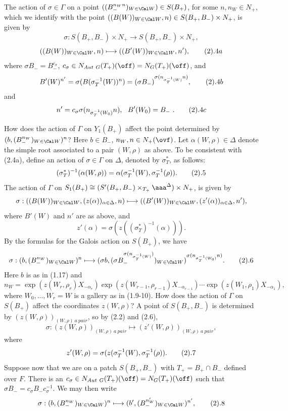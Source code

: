 \par
The action of $\sigma\in\Gamma$ on a point 
$((B_-^{n_Wn})_{W\in{\Cal W}})\in
S(B_+)$, for some
$n,n_W\in N_+$, which we identify with the point
$((B(W))_{W\in{\Cal W}},n)\in S(B_+,B_-)\times N_+$,
is given by
$$
\sigma: S(B_+,B_-)\times N_+ \rightarrow S(B_+,B_-)\times N_+,
$$
$$
((B(W))_{W\in{\Cal W}},n)\longmapsto
((B'(W))_{W\in{\Cal W}},n'),
\tag 2.4a
$$
where $\sigma B_-=B_-^{c_\sigma}$,
$c_\sigma\in N_{Aut\ G}(T_+)(\off)=N_G(T_+)(\off)$, and
$$
B'(W)^{n'}=\sigma(B(\sigma_T^{-1}(W))^n)=
(\sigma B_-)^{\sigma(n_{\sigma_T^{-1}(W)}n)},
\tag 2.4b
$$
and
$$
n'=c_\sigma\sigma(n_{\sigma_T^{-1}(W_0)}n),\ \ B'(W_0)= B_- \ .
\tag 2.4c
$$
\par
How does the action of $\Gamma$ on $Y_1(B_+)$ affect the
point determined by $(b,(B_-^{n_W})_{W\in{\Cal W}})^{n}$?
Here $b\in B_-$, $n_W,n\in N_+(\ovf)$. 
Let $\alpha(W,\rho)\in\Delta$ denote the simple root associated to
a pair $(W,\rho)$ as above.
To be consistent with (2.4a), define an action of $\sigma\in\Gamma$
on $\Delta$, denoted by $\sigma_T^*$, as follows:
$$
(\sigma_T^*)^{-1}(\alpha(W,\rho))
=\alpha(\sigma_T^{-1}(W),\sigma_T^{-1}(\rho)).
\tag 2.5
$$
The action of $\Gamma$ on 
$S_1(B_+)\cong (S'(B_+,B_-)\times_{T_+}\aaa^\Delta)\times N_+$,
is given by
$$
\sigma:((B(W))_{W\in{\Cal W}},(z(\alpha))_{\alpha\in \Delta},n)\longmapsto
((B'(W))_{W\in{\Cal W}},(z'(\alpha))_{\alpha\in \Delta},n'),
$$
where $B'(W)$ and $n'$ are as above, and
$$
z'(\alpha)=\sigma(z((\sigma_T^*)^{-1}(\alpha))).
$$
By the formulas
for the Galois action on $S(B_+)$, we have
$$
\sigma:(b,(B_-^{n_W})_{W\in{\Cal W}})^{n}\longmapsto
(\sigma b,(\sigma B_-^{\sigma (n_{\sigma^{-1}_T (W)})}
)_{W\in{\Cal W}})^{\sigma(n_{\sigma^{-1}_T (W_0)}n)}.
\tag 2.6
$$
Here $b$ is as in (1.17) and
$$
n_W=\exp (z(W_r,\rho_r)X_{-\alpha_r})
\exp (z(W_{r-1},\rho_{r-1})X_{-\alpha_{r-1}})\cdots 
\exp (z(W_1,\rho_1)X_{-\alpha_1}),
$$
where $W_0,...,W_r=W$ is a gallery as in (1.9-10).
How does the action of $\Gamma$ on $S(B_+)$ affect the coordinates
$z(W,\rho)$? A point of $S(B_+,B_-)$ is determined by
$(z(W,\rho))_{(W,\rho)\ a \ pair}$, so by (2.2) and (2.6),
$$
\sigma:(z(W,\rho))_{(W,\rho)\ a\ pair}\longmapsto 
(z'(W,\rho))_{(W,\rho)\ a\ pair},
$$
where 
$$
z'(W,\rho)=\sigma(z(\sigma_T^{-1}(W),\sigma_T^{-1}(\rho)).
\tag 2.7
$$
Suppose now that we are on a patch $S(B_+,B_-)$ with
$T_+=B_+\cap B_-$ defined over $F$.
There is an $c_\sigma\in N_{Aut\ G}(T_+)(\off)=
N_G(T_+)(\off)$ such that
$\sigma B_-=c_\sigma B_-c_\sigma^{-1}$. We may then write
$$
\sigma:(b,(B_-^{n_W})_{W\in{\Cal W}})^{n}\longmapsto
(b',(B_-^{n'_W})_{W\in{\Cal W}})^{n'},
\tag 2.8
$$
